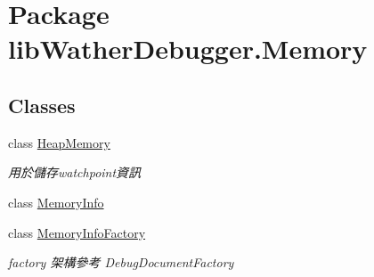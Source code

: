 \hypertarget{namespacelib_wather_debugger_1_1_memory}{\section{Package lib\+Wather\+Debugger.\+Memory}
\label{namespacelib_wather_debugger_1_1_memory}
}
\subsection*{Classes}
\begin{DoxyCompactItemize}
\item 
class \hyperlink{classlib_wather_debugger_1_1_memory_1_1_heap_memory}{Heap\+Memory}
\begin{DoxyCompactList}\small\item\em 用於儲存watchpoint資訊 \end{DoxyCompactList}\item 
class \hyperlink{classlib_wather_debugger_1_1_memory_1_1_memory_info}{Memory\+Info}
\item 
class \hyperlink{classlib_wather_debugger_1_1_memory_1_1_memory_info_factory}{Memory\+Info\+Factory}
\begin{DoxyCompactList}\small\item\em factory 架構參考 Debug\+Document\+Factory \end{DoxyCompactList}\end{DoxyCompactItemize}
